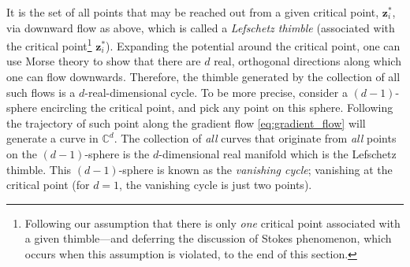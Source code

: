 \documentclass[11pt,a4paper]{article}
\def\BC{{\mathbb C}}
\begin{document}
It is the set of all points that may be reached out from a given critical point, $\boldsymbol{z}^*_i$, via downward flow as above, which is called a \textit{Lefschetz thimble} (associated with the critical point\footnote{Following our assumption that there is only \textit{one} critical point associated with a given thimble---and deferring the discussion of Stokes phenomenon, which occurs when this assumption is violated, to the end of this section.} $\boldsymbol{z}^*_i$). Expanding the potential around the critical point, one can use Morse theory to show that there are $d$ real, orthogonal directions along which one can flow downwards. Therefore, the thimble generated by the collection of all such flows is a $d$-real-dimensional cycle. To be more precise, consider a $(d-1)$-sphere encircling the critical point, and pick any point on this sphere. Following the trajectory of such point along the gradient flow \eqref{eq:gradient_flow} will generate a curve in $\BC^d$. The collection of \textit{all} curves that originate from \textit{all} points on the $(d-1)$-sphere is the $d$-dimensional real manifold which is the Lefschetz thimble. This $(d-1)$-sphere is known as the \textit{vanishing cycle}; vanishing at the critical point (for $d=1$, the vanishing cycle is just two points).
\end{document}

